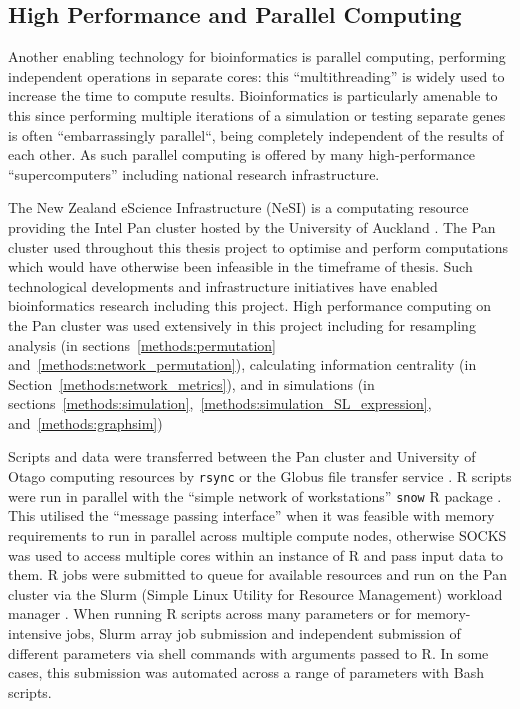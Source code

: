 \FloatBarrier

\subsection{High Performance and Parallel Computing} \label{methods:HPC}
Another enabling technology for bioinformatics is parallel computing, performing independent operations in separate cores: this ``multithreading'' is widely used to increase the time to compute results. Bioinformatics is particularly amenable to this since performing multiple iterations of a simulation or testing separate genes is often ``embarrassingly parallel``, being completely independent of the results of each other. As such parallel computing is offered by many high-performance ``supercomputers'' including national research infrastructure.

The New Zealand eScience Infrastructure (NeSI) is a computating resource providing the Intel Pan cluster hosted by the University of Auckland \citep{NeSI}. The Pan cluster used throughout this thesis project to optimise and perform computations which would have otherwise been infeasible in the timeframe of thesis. Such technological developments and infrastructure initiatives have enabled bioinformatics research including this project.  High performance computing on the Pan cluster was used extensively in this project including for resampling analysis (in sections~\ref{methods:permutation} and~\ref{methods:network_permutation}), calculating information centrality (in Section~\ref{methods:network_metrics}), and in simulations (in sections~\ref{methods:simulation},~\ref{methods:simulation_SL_expression}, and~\ref{methods:graphsim})

Scripts and data were transferred between the Pan cluster and University of Otago computing resources by \texttt{rsync} or the Globus file transfer service \citep{Globus}. R scripts \citep{R_core} were run in parallel with the ``simple network of workstations'' \texttt{snow} R package \citet{snow}. This utilised the ``message passing interface'' \citep{Rmpi} when it was feasible with memory requirements to run in parallel across multiple compute nodes, otherwise SOCKS was used to access multiple cores within an instance of R and pass input data to them. R jobs were submitted to queue for available resources and run on the Pan cluster via the Slurm (Simple Linux Utility for Resource Management) workload manager \citep{slurm}. When running R scripts across many parameters or for memory-intensive jobs, Slurm array job submission and independent submission of different parameters via shell commands with arguments passed to R. In some cases, this submission was automated across a range of parameters with Bash scripts.

